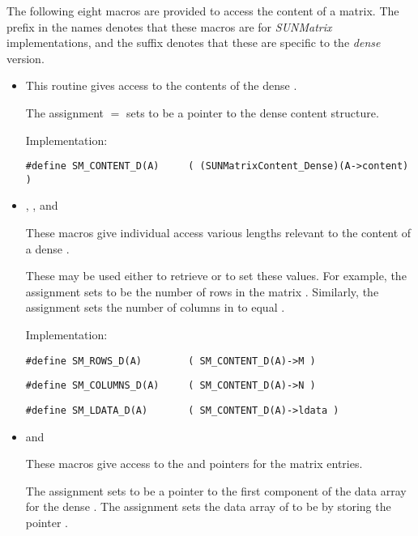 \noindent The following eight macros are provided to access the
content of a {\sunmatdense} matrix. The prefix  in the names
denotes that these macros are for \emph{SUNMatrix} implementations,
and the suffix  denotes that these are specific to
the \emph{dense} version.
\begin{itemize}

\item {}
    
  This routine gives access to the contents of the
  dense .
  
  The assignment  $=$  sets
   to be a pointer to the dense  content  
  structure.                                             
                                                            
  Implementation: 
  
  \verb|#define SM_CONTENT_D(A)     ( (SUNMatrixContent_Dense)(A->content) )|
  
\item {}, , and 

  These macros give individual access various lengths relevant to the
  content of a dense .                        
                                                               
  These may be used either to retrieve or to set these values.  For
  example, the assignment  sets  to be
  the number of rows in the matrix .  Similarly, the
  assignment  sets the number of
  columns in  to equal .
  
  Implementation: 

  \verb|#define SM_ROWS_D(A)        ( SM_CONTENT_D(A)->M )|

  \verb|#define SM_COLUMNS_D(A)     ( SM_CONTENT_D(A)->N )|

  \verb|#define SM_LDATA_D(A)       ( SM_CONTENT_D(A)->ldata )|

\item {} and 
                                                            
  These macros give access to the  and  pointers for
  the matrix entries.

  The assignment  sets  to be     
  a pointer to the first component of the data array for the dense
   .  The assignment 
  sets the data array of  to be  by storing the
  pointer .
  

\end{itemize}
